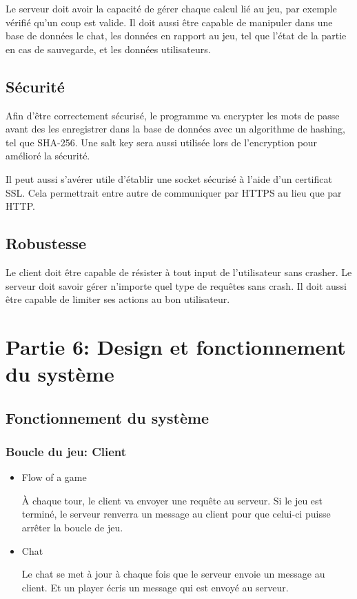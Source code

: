Le serveur doit avoir la capacité de gérer chaque calcul lié au jeu, par exemple vérifié qu'un coup est valide. Il doit aussi être capable
de manipuler dans une base de données le chat, les données en rapport au jeu, tel que l'état de la partie en cas de sauvegarde, et les 
données utilisateurs.

\subsection{Sécurité}
Afin d'être correctement sécurisé, le programme va encrypter les mots de passe avant des les enregistrer dans la base de données avec un
algorithme de hashing, tel que SHA-256. Une salt key sera aussi utilisée lors de l'encryption pour amélioré la sécurité.

Il peut aussi s'avérer utile d'établir une socket sécurisé à l'aide d'un certificat SSL. Cela permettrait entre autre de communiquer par HTTPS au
lieu que par HTTP.

\subsection{Robustesse}
Le client doit être capable de résister à tout input de l'utilisateur sans crasher.
Le serveur doit savoir gérer n'importe quel type de requêtes sans crash. Il doit aussi être capable de limiter ses actions au bon utilisateur.

\section{Partie 6: Design et fonctionnement du système}
\subsection{Fonctionnement du système}
\subsubsection{Boucle du jeu: Client}


\begin{itemize}
    \item Flow of a game

        À chaque tour, le client va envoyer une requête au serveur. Si le jeu est terminé, le serveur renverra un message au client pour que
        celui-ci puisse arrêter la boucle de jeu.
    \item Chat

        Le chat se met à jour à chaque fois que le serveur envoie un message au client. Et un player écris un message qui est envoyé au serveur.
\end{itemize}
